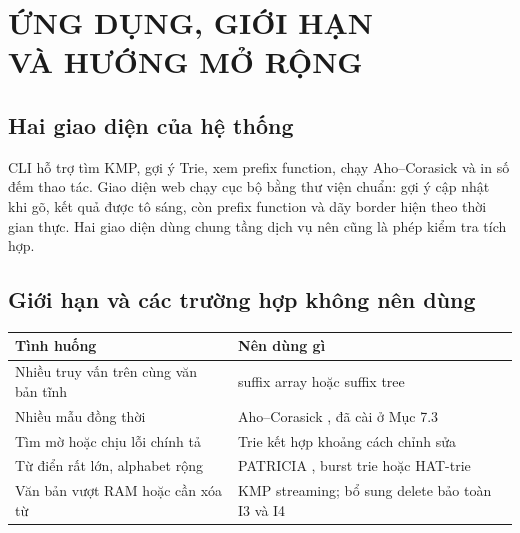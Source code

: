 \chapter{ỨNG DỤNG, GIỚI HẠN\\VÀ HƯỚNG MỞ RỘNG}
\label{ch:7}

\section{Hai giao diện của hệ thống}
\label{sec:7-1}

CLI hỗ trợ tìm KMP, gợi ý Trie, xem prefix function, chạy
Aho--Corasick và in số đếm thao tác. Giao diện web chạy cục bộ bằng
thư viện chuẩn: gợi ý cập nhật khi gõ, kết quả được tô sáng, còn prefix
function và dãy border hiện theo thời gian thực. Hai giao diện dùng
chung tầng dịch vụ nên cũng là phép kiểm tra tích hợp.

\section{Giới hạn và các trường hợp không nên dùng}
\label{sec:7-2}

\begin{center}
\end{center}

{\footnotesize\singlespacing
\begin{longtable}[]{@{}
  >{\raggedright\arraybackslash}p{}
  >{\raggedright\arraybackslash}p{}@{}}
\toprule\noalign{}
\begin{minipage}[b]{\linewidth}\raggedright
Tình huống
\end{minipage} & \begin{minipage}[b]{\linewidth}\raggedright
Nên dùng gì
\end{minipage} \\
\midrule\noalign{}
\endhead
\bottomrule\noalign{}
\endlastfoot
Nhiều truy vấn trên cùng văn bản tĩnh & suffix array
\cite{manber1993} hoặc suffix tree \cite{ukkonen1995} \\
Nhiều mẫu đồng thời & Aho--Corasick \cite{aho1975}, đã cài ở Mục 7.3 \\
Tìm mờ hoặc chịu lỗi chính tả & Trie kết hợp khoảng cách chỉnh sửa
\cite{navarro2001} \\
Từ điển rất lớn, alphabet rộng & PATRICIA \cite{morrison1968},
burst trie \cite{heinz2002} hoặc HAT-trie \cite{askitis2007} \\
Văn bản vượt RAM hoặc cần xóa từ & KMP streaming; bổ sung delete bảo
toàn I3 và I4 \\
\end{longtable}
}

